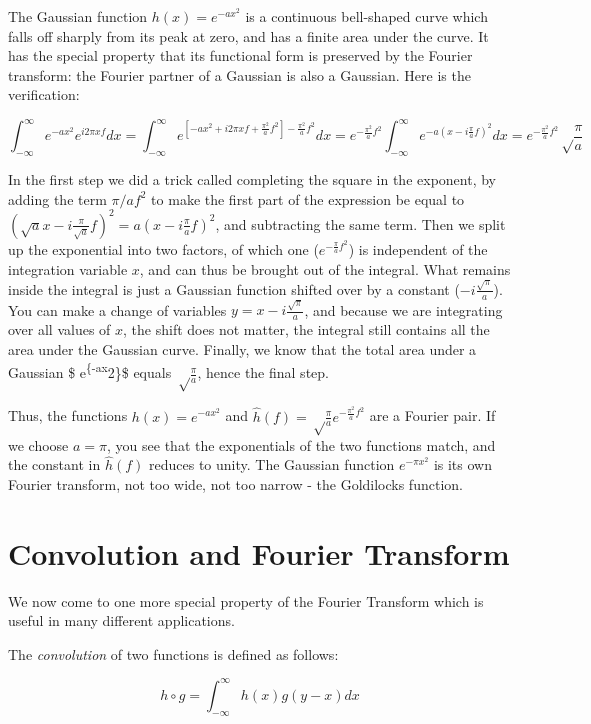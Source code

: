 \documentclass[
  letterpaper,
  DIV=11,
  numbers=noendperiod]{scrreprt}
\begin{document}
The Gaussian function \(h(x)= e^{-ax^2}\) is a continuous bell-shaped
curve which falls off sharply from its peak at zero, and has a finite
area under the curve. It has the special property that its functional
form is preserved by the Fourier transform: the Fourier partner of a
Gaussian is also a Gaussian. Here is the verification:

\[
\int_{-\infty} ^\infty e^{-ax^2} e^{i2\pi xf} dx = \int_{-\infty} ^\infty e^{[-ax^2+i2\pi xf +\frac{\pi^2}{a}f^2] - \frac{\pi^2}{a}f^2}dx = e^{- \frac{\pi^2}{a}f^2} \int_{-\infty} ^\infty e^{-a(x-i\frac{\pi}{a}f)^2}dx = e^{- \frac{\pi^2}{a}f^2}  \sqrt\frac{\pi}{a}
\]

In the first step we did a trick called completing the square in the
exponent, by adding the term \(\pi/a f^2\) to make the first part of the
expression be equal to
\((\sqrt{a}x-i\frac{\pi}{\sqrt{a}}f)^2=a(x-i\frac{\pi}{a}f)^2\), and
subtracting the same term. Then we split up the exponential into two
factors, of which one (\(e^{- \frac{\pi}{a}f^2}\)) is independent of the
integration variable \(x\), and can thus be brought out of the integral.
What remains inside the integral is just a Gaussian function shifted
over by a constant (\(-i\frac{\sqrt\pi}{a}\)). You can make a change of
variables \(y=x-i\frac{\sqrt\pi}{a}\), and because we are integrating
over all values of \(x\), the shift does not matter, the integral still
contains all the area under the Gaussian curve. Finally, we know that
the total area under a Gaussian \$ e\textsuperscript{\{-ax}2\}\$ equals
\(\sqrt\frac{\pi}{a}\), hence the final step.

Thus, the functions \(h(x)= e^{-ax^2}\) and
\(\widehat h(f) = \sqrt\frac{\pi}{a} e^{- \frac{\pi^2}{a}f^2}\) are a
Fourier pair. If we choose \(a = \pi\), you see that the exponentials of
the two functions match, and the constant in \(\widehat h(f)\) reduces
to unity. The Gaussian function \(e^{-\pi x^2}\) is its own Fourier
transform, not too wide, not too narrow - the Goldilocks function.

\section{Convolution and Fourier
Transform}\label{convolution-and-fourier-transform}

We now come to one more special property of the Fourier Transform which
is useful in many different applications.

\begin{tcolorbox}[enhanced jigsaw, bottomtitle=1mm, coltitle=black, colbacktitle=quarto-callout-note-color!10!white, toprule=.15mm, leftrule=.75mm, titlerule=0mm, breakable, bottomrule=.15mm, arc=.35mm, opacitybacktitle=0.6, opacityback=0, colframe=quarto-callout-note-color-frame, left=2mm, toptitle=1mm, rightrule=.15mm, title=\textcolor{quarto-callout-note-color}{\faInfo}\hspace{0.5em}{Definition}, colback=white]

The \emph{convolution} of two functions is defined as follows:

\[ h\circ g = \int _{-\infty} ^\infty h(x) g(y-x) dx \]

\end{tcolorbox}
\end{document}
